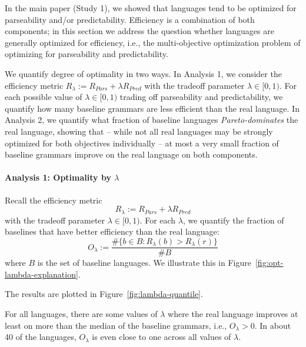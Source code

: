 \documentclass[10pt,twoside,lineno]{article}
\begin{document}
In the main paper (Study 1), we showed that languages tend to be optimized for parseability and/or predictability.
Efficiency is a combination of both components; in this section we address the question whether languages are generally optimized for efficiency, i.e., the multi-objective optimization problem of optimizing for parseability and predictability.

We quantify degree of optimality in two ways.
In Analysis 1, we consider the efficiency metric $R_\lambda := R_{Pars} + \lambda R_{Pred}$ with the tradeoff parameter $\lambda \in [0,1)$.
For each possible value of $\lambda \in [0,1)$ trading off parseability and predictability, we quantify how many baseline grammars are less efficient than the real language.
In Analysis 2, we quantify what fraction of baseline languages \emph{Pareto-dominates} the real language, showing that -- while not all real languages may be strongly optimized for both objectives individually -- at most a very small fraction of baseline grammars improve on the real language on both components.

\paragraph{Analysis 1: Optimality by $\lambda$}

Recall the efficiency metric
\begin{equation}
	R_\lambda := R_{Pars} + \lambda R_{Pred}
\end{equation}
 with the tradeoff parameter $\lambda \in [0,1)$.
For each $\lambda$, we quantify the fraction of baselines that have better efficiency than the real language:
\begin{equation}
	O_\lambda := \frac{\# \{b \in B: R_{\lambda}(b) > R_{\lambda}(r)\}}{\# B}
\end{equation}
where $B$ is the set of baseline languages.
We illustrate this in Figure~\ref{fig:opt-lambda-explanation}.

The results are plotted in Figure~\ref{fig:lambda-quantile}.

For all languages, there are some values of $\lambda$ where the real language improves at least on more than the median of the baseline grammars, i.e., $O_\lambda >0$.
In about 40 of the languages, $O_\lambda$ is even close to one across all values of $\lambda$.
\end{document}
